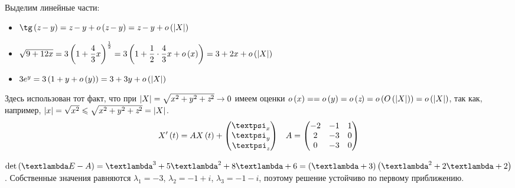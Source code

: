 \documentclass[a5paper,10pt]{article}
\begin{document}
Выделим линейные части:
    
\begin{itemize}
    \item $\tg\br{\zed - y} = \zed - y + o\br{\zed - y} = \zed - y + o\br{\vbr{X}}$

    \item $\sqrt{9 + 12x} = 3 \left(1 + \dfrac {4} {3} x\right)^{\frac {1} {2}} = 3 \left(1 + \dfrac {1} {2} \cdot \dfrac {4} {3} x + o\left(x\right)\right) = 3 + 2x + o\left(\left|X\right|\right)$
    
    \item $3e^{y} = 3 \left(1 + y + o\left(y\right)\right) = 3 + 3y + o\left(\left|X\right|\right)$
\end{itemize}

Здесь использован тот факт, что при $\left|X\right| = \sqrt{x^2 + y^2 + \textit{z}^2} \to 0$ имеем оценки $o\br{x} = \linebreak =  o\br{y} = o\br{\zed} = o\br{O\br{\vbr{X}}} = o\br{\vbr{X}}$, так как, например, $\left|x\right| = \sqrt{x^2} \leqslant \sqrt{x^2 + y^2 + \textit{z}^2} = \left|X\right|$.
\begin{align*}
    X'\br{t} = A X\br{t} + \begin{pmatrix} \psi_{x} \\ \psi_{y} \\ \psi_{\zed} \end{pmatrix} && A = \begin{pmatrix} -2 & -1 & 1 \\ 2 & -3 & 0 \\ 0 & -3 & 0 \end{pmatrix}
\end{align*}

$\det\br{\lambda E - A} =  \lambda^3 + 5\lambda^2 + 8\lambda + 6 = \br{\lambda + 3} \br{\lambda^2 + 2\lambda + 2}$. Собственные значения равняются $\lambda_{1} = -3$, $\lambda_{2} = -1 + i$, $\lambda_{3} = -1 - i$, поэтому решение устойчиво по первому приближению.
\end{document}

